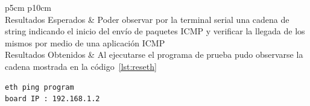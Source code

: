 \begin{table}[h!]
\begin{tabular}{ p{5cm} p{10cm}  }
		\hline
 		\\
		\hline
		Resultados Esperados & Poder observar por la terminal serial una cadena de string indicando el inicio del envío de paquetes ICMP y verificar la llegada de los mismos por medio de una aplicación ICMP \\
		\hline	
		Resultados Obtenidos & Al ejecutarse el programa de prueba pudo observarse la cadena mostrada en la código~\ref{lst:reseth}\\
		\hline
		\end{tabular}
		\caption{Caso de prueba T005}
		\label{tab:cp5}
		\end{table}

\begin{lstlisting}[frame=single,caption={Salida de la terminal serie durante la ejecución del programa ethmac-ping.or32},label={lst:reseth}]
eth ping program
board IP : 192.168.1.2
\end{lstlisting}

